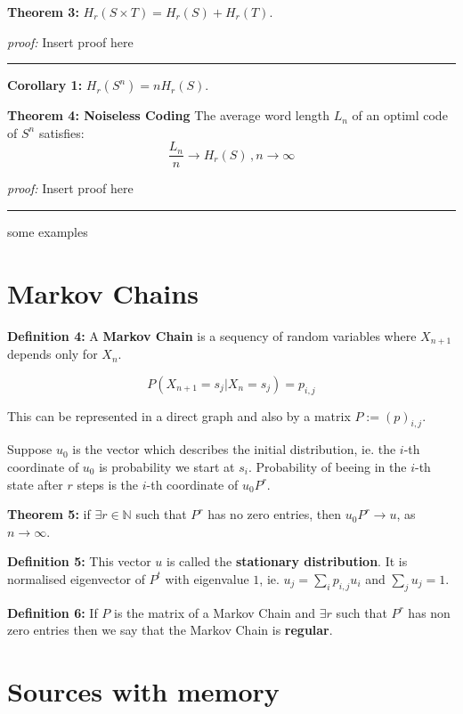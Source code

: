 \documentclass{article}
\begin{document}
\noindent \textbf{Theorem  3:} $H_{r}(S \times T) = H_{r} (S) + H_{r} (T)$.

\noindent\textit{proof:}  Insert proof here

\noindent
{\color{gray} \rule{\linewidth}{0.5mm} }

\noindent \textbf{Corollary  1:} $H_{r}(S^n) = n H_{r} (S)$. 


\noindent \textbf{Theorem  4: Noiseless Coding} The average word length $L_n$ of an optiml code of $S^n$ satisfies:
$$
\frac{L_n}{n} \longrightarrow H_{r} (S) \, , n \rightarrow \infty
$$ 
  
\noindent\textit{proof:}  Insert proof here

\noindent
{\color{gray} \rule{\linewidth}{0.5mm} }


some examples

	\section{Markov Chains}
	
\noindent \textbf{Definition 	4:} A \textbf{Markov Chain} is a sequency of random variables where $X_{n + 1}$ depends only for $X_{n}$.

$$
P(X_{n + 1} = s_j | X_{n} = s_j ) = p_{i, j}
$$

\noindent This can be represented in a direct graph and also by a matrix $P := (p)_{i, j}$.

\noindent Suppose $u_0$ is the vector which describes the initial distribution, ie. the $i$-th coordinate of $u_0$ is probability we start at $s_i$. Probability of beeing in the $i$-th state after $r$ steps is the $i$-th coordinate of $u_{0} P^{r}$.

\noindent \textbf{Theorem  5:} if $\exists r \in \mathbb{N}$ such that $P^r$ has no zero entries, then $u_{0} P^{r} \longrightarrow u$, as $n \rightarrow \infty$.

\noindent \textbf{Definition 	5:}  This vector $u$ is called the \textbf{stationary distribution}. It is normalised eigenvector of $P^t$ with eigenvalue $1$, ie. $u_j = \sum_i {p_{i, j} u_i}$ and $\sum_{j} {u_j} = 1$.
 	 
\noindent \textbf{Definition 	6:} If $P$ is the matrix of a Markov Chain and $\exists r$ such that $P^r$ has non zero entries then we say that the Markov Chain is \textbf{regular}.

  
  \section{Sources with memory}
  
\end{document}
